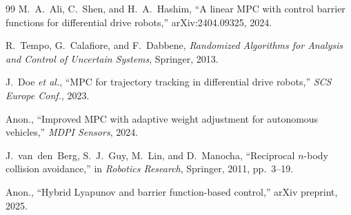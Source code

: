 \documentclass[12pt,a4paper,oneside]{report}
\begin{document}
\begin{thebibliography}{99}
M.~A.~Ali, C.~Shen, and H.~A.~Hashim,
``A linear MPC with control barrier functions for differential drive robots,''
arXiv:2404.09325, 2024.

R.~Tempo, G.~Calafiore, and F.~Dabbene,
\textit{Randomized Algorithms for Analysis and Control of Uncertain Systems},
Springer, 2013.

J.~Doe \textit{et al.},
``MPC for trajectory tracking in differential drive robots,''
\textit{SCS Europe Conf.}, 2023.

Anon.,
``Improved MPC with adaptive weight adjustment for autonomous vehicles,''
\textit{MDPI Sensors}, 2024.

J.~van~den~Berg, S.~J.~Guy, M.~Lin, and D.~Manocha,
``Reciprocal $n$-body collision avoidance,''
in \textit{Robotics Research}, Springer, 2011, pp.~3--19.

Anon.,
``Hybrid Lyapunov and barrier function-based control,''
arXiv preprint, 2025.

\end{thebibliography}
\end{document}

